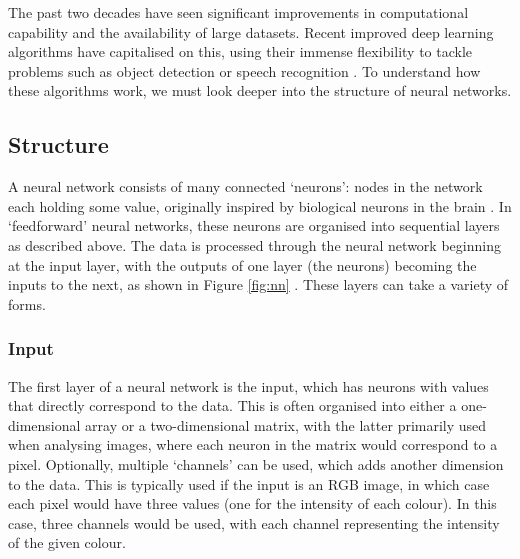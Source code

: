\documentclass[11pt,a4paper,onecolumn]{report}
\begin{document}
The past two decades have seen significant improvements in computational
capability and the availability of large datasets. Recent improved deep
learning algorithms have capitalised on this, using their immense flexibility to
tackle problems such as object detection \citep{krizhevsky_imagenet_2017} or
speech recognition \citep{toth_phone_2015}. To understand how these algorithms
work, we must look deeper into the structure of neural networks.

%
%


\subsection{Structure}

A neural network consists of many connected `neurons': nodes in the network each
holding some value, originally inspired by biological neurons in the brain
\citep{mcculloch1943}. In `feedforward' neural networks, these neurons are
organised into sequential layers as described above. The data is processed
through the neural network beginning at the input layer, with the outputs of one
layer (the neurons) becoming the inputs to the next, as shown in Figure
\ref{fig:nn} \citep{michelucci2018}. These layers can take a variety of forms.


\subsubsection{Input}
The first layer of a neural network is the input, which has neurons with values
that directly correspond to the data. This is often organised into either a
one-dimensional array or a two-dimensional matrix, with the latter primarily
used when analysing images, where each neuron in the matrix would correspond to
a pixel. Optionally, multiple `channels' can be used, which adds another
dimension to the data. This is typically used if the input is an RGB image, in
which case each pixel would have three values (one for the intensity of each
colour). In this case, three channels would be used, with each channel
representing the intensity of the given colour.\\

\end{document}
